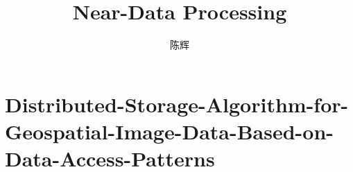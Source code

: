 \documentclass{article}
\title{Near-Data Processing}
\author{陈辉}
\date{}
\begin{document}
\maketitle
\tableofcontents
\newpage
\section{Distributed-Storage-Algorithm-for-Geospatial-Image-Data-Based-on-Data-Access-Patterns}


\end{document}
